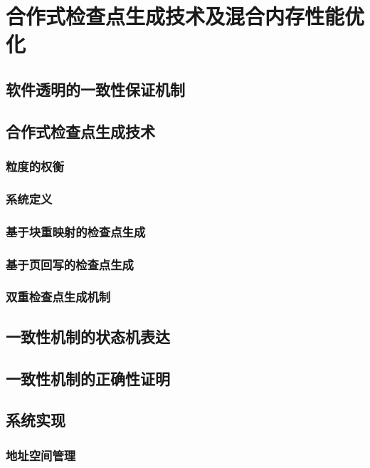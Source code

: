\chapter{合作式检查点生成技术及混合内存性能优化}
\label{chap:thnvm}

\section{软件透明的一致性保证机制}

\section{合作式检查点生成技术}

\subsection{粒度的权衡}

\subsection{系统定义}

\subsection{基于块重映射的检查点生成}

\subsection{基于页回写的检查点生成}

\subsection{双重检查点生成机制}

\section{一致性机制的状态机表达}

\section{一致性机制的正确性证明}

\section{系统实现}

\subsection{地址空间管理}

